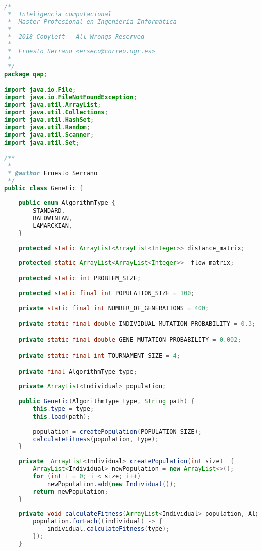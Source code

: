 \begin{lstlisting}[language=java,caption={Genetic.java},captionpos=b]
/*  
 *  Inteligencia computacional
 *  Master Profesional en Ingeniería Informática
 * 
 *  2018 Copyleft - All Wrongs Reserved
 *
 *  Ernesto Serrano <erseco@correo.ugr.es>
 * 
 */
package qap;

import java.io.File;
import java.io.FileNotFoundException;
import java.util.ArrayList;
import java.util.Collections;
import java.util.HashSet;
import java.util.Random;
import java.util.Scanner;
import java.util.Set;

/**
 * 
 * @author Ernesto Serrano
 */
public class Genetic {
    
    public enum AlgorithmType {
        STANDARD, 
        BALDWINIAN, 
        LAMARCKIAN,
    }
    
    protected static ArrayList<ArrayList<Integer>> distance_matrix;
    
    protected static ArrayList<ArrayList<Integer>>  flow_matrix;
    
    protected static int PROBLEM_SIZE;
    
    protected static final int POPULATION_SIZE = 100;
    
    private static final int NUMBER_OF_GENERATIONS = 400;

    private static final double INDIVIDUAL_MUTATION_PROBABILITY = 0.3;

    private static final double GENE_MUTATION_PROBABILITY = 0.002;

    private static final int TOURNAMENT_SIZE = 4;

    private final AlgorithmType type;
        
    private ArrayList<Individual> population;
    
    public Genetic(AlgorithmType type, String path) {
        this.type = type;
        this.load(path);
        
        population = createPopulation(POPULATION_SIZE);
        calculateFitness(population, type);
    }
    
    private  ArrayList<Individual> createPopulation(int size)  {
        ArrayList<Individual> newPopulation = new ArrayList<>();
        for (int i = 0; i < size; i++)
            newPopulation.add(new Individual());
        return newPopulation;
    }
    
    private void calculateFitness(ArrayList<Individual> population, AlgorithmType type) {
        population.forEach((individual) -> {
            individual.calculateFitness(type);
        }); 
    }


\end{lstlisting}
